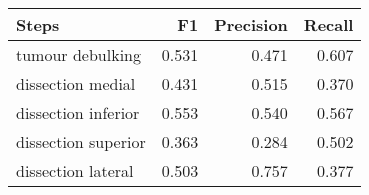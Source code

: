 \begin{tabular}{lrrr}
\toprule
Steps & F1 & Precision & Recall \\
\midrule
tumour debulking & 0.531 & 0.471 & 0.607 \\
dissection medial & 0.431 & 0.515 & 0.370 \\
dissection inferior & 0.553 & 0.540 & 0.567 \\
dissection superior & 0.363 & 0.284 & 0.502 \\
dissection lateral & 0.503 & 0.757 & 0.377 \\
\bottomrule
\end{tabular}
